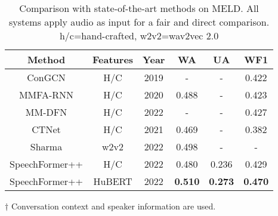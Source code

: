 \documentclass[lettersize,journal]{IEEEtran}
\begin{document}
\begin{table}[t]
    \caption{Comparison with state-of-the-art methods on MELD. All systems apply audio as input for a fair and direct comparison. h/c=hand-crafted, w2v2=wav2vec 2.0}
    \label{tab_4}
    \centering
    \begin{threeparttable}
    \begin{tabular}{ccc||ccc}
    \hline
    Method   & Features  & Year  & WA & UA & WF1        \\ \hline
    \tnote{$\dagger$}\; ConGCN\cite{ConGCN} & H/C & 2019 & - & - & 0.422    \\
    MMFA-RNN\cite{MMFA-RNN} & H/C & 2020 & 0.488  & - & 0.423    \\
    \tnote{$\dagger$}\; MM-DFN\cite{MM-DFN} & H/C & 2022 & -  & - & 0.427    \\
    \tnote{$\dagger$}\; CTNet\cite{ctnet} & H/C & 2021  & 0.469 & - & 0.382 \\
    Sharma\cite{sota_w2v2_meld_1} & w2v2 & 2022 & 0.498 & - & - \\ \hline
    SpeechFormer++  & H/C  & 2022 & 0.480 & 0.236 & 0.429   \\
    SpeechFormer++  & HuBERT  & 2022 & \textbf{0.510} & \textbf{0.273} & \textbf{0.470}    \\ \hline
    \end{tabular}
    \begin{tablenotes}
        \footnotesize
        \item[$\dagger$] Conversation context and speaker information are used.
    \end{tablenotes}
    \end{threeparttable}
\end{table}

\begin{table}[t]
    \caption{Performance and computational efficiency of Transformer and SpeechFormer++ using HuBERT features on Pitt.\\Gain indicates the relative improvement (+) or reduction (-)}
    \label{tab_5}
    \centering
\end{table}
\end{document}
